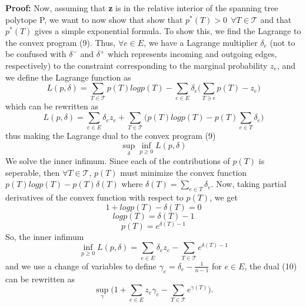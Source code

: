 \documentclass[oneside]{projectpaper} %
\begin{document}
\newline
\newline
\textbf{Proof:} Now, assuming that \textbf{z} is in the relative interior of the spanning tree polytope P, we want to now show that show that $p^*(T) > 0 \ \ \forall T \in \mathcal{T}$ and that $p^*(T)$ gives a simple exponential formula. To show this, we find the Lagrange to the convex program (9). Thus, $\forall e \in E$, we have a Lagrange multiplier $\delta_e$ (not to be confused with $\delta^-$ and $\delta^+$ which represents incoming and outgoing edges, respectively) to the constraint corresponding to the marginal probability $z_e$, and we define the Lagrange function as
\begin{equation*}
L(p,\delta) = \sum\limits_{T \in \mathcal{T}}p(T)logp(T) - \sum\limits_{e \in E}\delta_e\bigg(\sum\limits_{T \ni e}p(T) - z_e\bigg) 
\end{equation*}
which can be rewritten as
\begin{equation*}
L(p,\delta) = \sum\limits_{e \in E}\delta_ez_e + \sum\limits_{T \in \mathcal{T}}\bigg(p(T)logp(T)  - p(T) \sum\limits_{e \in T}\delta_e\bigg)
\end{equation*}
thus making the Lagrange dual to the convex program (9)
\begin{equation}
\sup_{\delta}\inf_{p \geq 0}L(p,\delta)
\end{equation}
We solve the inner infimum. Since each of the contributions of $p(T)$ is seperable, then $\forall T \in \mathcal{T}$, $p(T)$ must minimize the convex function $p(T)logp(T) - p(T)\delta(T)$ where $\delta(T) = \sum\limits_{e \in T}\delta_e$. Now, taking partial derivatives of the convex function with respect to $p(T)$, we get
\begin{equation*}
1 + logp(T) - \delta(T) = 0
\end{equation*}
\begin{equation*}
logp(T) = \delta(T) - 1
\end{equation*}
\begin{equation}
p(T) = e^{\delta(T) - 1}
\end{equation}
So, the inner infimum
\begin{equation*}
\inf_{p \geq 0}L(p,\delta) = \sum\limits_{e \in E}\delta_{e}z_e - \sum\limits_{T \in \mathcal{T}}e^{\delta(T) - 1}
\end{equation*}
and we use a change of variables to define $\gamma_e= \delta_e - \frac{1}{n-1}$ for $e \in E$, the dual (10) can be rewritten as
\begin{equation}
\sup_{\gamma}\bigg(1 + \sum\limits_{e \in E}z_e\gamma_e - \sum\limits_{T \in \mathcal{T}}e^{\gamma(T)}\bigg).
\end{equation}
\end{document}
